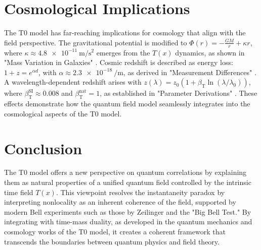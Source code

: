 \documentclass[a4paper,12pt]{article}
\newcommand{\Tfield}{T(x)}
\newcommand{\betaT}{\beta_{\text{T}}}
\theoremstyle{definition}
\theoremstyle{remark}
\begin{document}
	\section{Cosmological Implications}
	
	The T0 model has far-reaching implications for cosmology that align with the field perspective. The gravitational potential is modified to \(\Phi(r) = -\frac{G M}{r} + \kappa r\), where \(\kappa \approx \SI{4.8e-11}{\meter\per\second\squared}\) emerges from the \(\Tfield\) dynamics, as shown in "Mass Variation in Galaxies" \cite{pascher_galaxies_2025}. Cosmic redshift is described as energy loss: \(1 + z = e^{\alpha d}\), with \(\alpha \approx \SI{2.3e-18}{\per\meter}\), as derived in "Measurement Differences" \cite{pascher_messdifferenzen_2025}. A wavelength-dependent redshift arises with \(z(\lambda) = z_0 (1 + \betaT \ln(\lambda/\lambda_0))\), where \(\betaT^{\text{SI}} \approx 0.008\) and \(\betaT^{\text{nat}} = 1\), as established in "Parameter Derivations" \cite{pascher_params_2025}. These effects demonstrate how the quantum field model seamlessly integrates into the cosmological aspects of the T0 model.
	
	\section{Conclusion}
	
	The T0 model offers a new perspective on quantum correlations by explaining them as natural properties of a unified quantum field controlled by the intrinsic time field \(\Tfield\). This viewpoint resolves the instantaneity paradox by interpreting nonlocality as an inherent coherence of the field, supported by modern Bell experiments such as those by Zeilinger and the "Big Bell Test." By integrating with time-mass duality, as developed in the quantum mechanics and cosmology works of the T0 model, it creates a coherent framework that transcends the boundaries between quantum physics and field theory.
	
\end{document}
